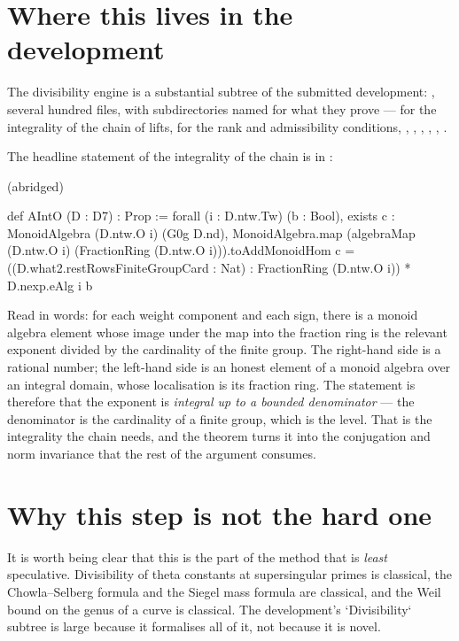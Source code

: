 \section{Where this lives in the development}The divisibility engine is a substantial subtree of the submitted development:
, several hundred files, with
subdirectories named for what they prove ---
 for the integrality of the chain of lifts,
 for the rank and admissibility conditions,
, ,
, , ,
.

The headline statement of the integrality of the chain is in
:

\begin{seamnote}{ (abridged)}
{\footnotesize
\begin{leanquote}
def AIntO (D : D7) : Prop :=
  forall (i : D.ntw.Tw) (b : Bool),
    exists c : MonoidAlgebra (D.ntw.O i) (G0g D.nd),
      MonoidAlgebra.map (algebraMap (D.ntw.O i)
(FractionRing (D.ntw.O i))).toAddMonoidHom c
        = ((D.what2.restRowsFiniteGroupCard : Nat)
             : FractionRing (D.ntw.O i)) * D.nexp.eAlg i b
\end{leanquote}
}
\end{seamnote}

Read in words: for each weight component and each sign, there is a monoid
algebra element whose image under the map into the fraction ring is the
relevant exponent divided by the cardinality of the finite group. The
right-hand side is a rational number; the left-hand side is an honest element
of a monoid algebra over an integral domain, whose localisation is its
fraction ring. The statement is therefore that the exponent is \emph{integral
up to a bounded denominator} --- the denominator is the cardinality of a finite
group, which is the level. That is the integrality the chain needs, and the
theorem
 turns it into the conjugation
and norm invariance that the rest of the argument consumes.

\section{Why this step is not the hard one}It is worth being clear that this is the part of the method that is
\emph{least} speculative. Divisibility of theta constants at supersingular
primes is classical, the Chowla--Selberg formula and the Siegel mass formula
are classical, and the Weil bound on the genus of a curve is classical. The
development's `Divisibility` subtree is large because it formalises all of it,
not because it is novel.


